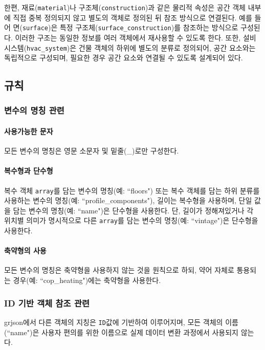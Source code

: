 한편, 재료(\texttt{material})나 구조체(\texttt{construction})과 같은 물리적 속성은 공간 객체 내부에 직접 중복 정의되지 않고 별도의 객체로 정의된 뒤 참조 방식으로 연결된다. 예를 들어 면(\texttt{surface})은 특정 구조체(\texttt{surface\_construction})를 참조하는 방식으로 구성된다. 이러한 구조는 동일한 정보를 여러 객체에서 재사용할 수 있도록 한다. 또한, 설비 시스템(\texttt{hvac\_system})은 건물 객체의 하위에 별도의 분류로 정의되어, 공간 요소와는 독립적으로 구성되며, 필요한 경우 공간 요소와 연결될 수 있도록 설계되어 있다.

\subsection{규칙}

\subsubsection{변수의 명칭 관련}

\paragraph{사용가능한 문자} 모든 변수의 명칭은 영문 소문자 및 밑줄(\_)로만 구성한다.

\paragraph{복수형과 단수형} 복수 객체 \texttt{array}를 담는 변수의 명칭(예: ``floors") 또는 복수 객체를 담는 하위 분류를 사용하는 변수의 명칭(예: ``profile\_components"), 길이는 복수형을 사용하며, 단일 값을 담는 변수의 명칭(예: ``name")은 단수형을 사용한다. 단, 길이가 정해져있거나 각 위치별 의미가 명시적으로 다른 \texttt{array}를 담는 변수의 명칭(예: ``vintage")은 단수형을 사용한다.

\paragraph{축약형의 사용} 모든 변수의 명칭은 축약형을 사용하지 않는 것을 원칙으로 하되, 약어 자체로 통용되는 경우(예: ``cop\_heating")에는 축약형을 사용한다.

\subsubsection{ID 기반 객체 참조 관련} \label{subsubsection:ioref:id_description}
grjson에서 다른 객체의 지칭은 \texttt{ID}값에 기반하여 이루어지며, 모든 객체의 이름(``name")은 사용자 편의를 위한 이름으로 실제 데이터 변환 과정에서 사용되지 않는다.

